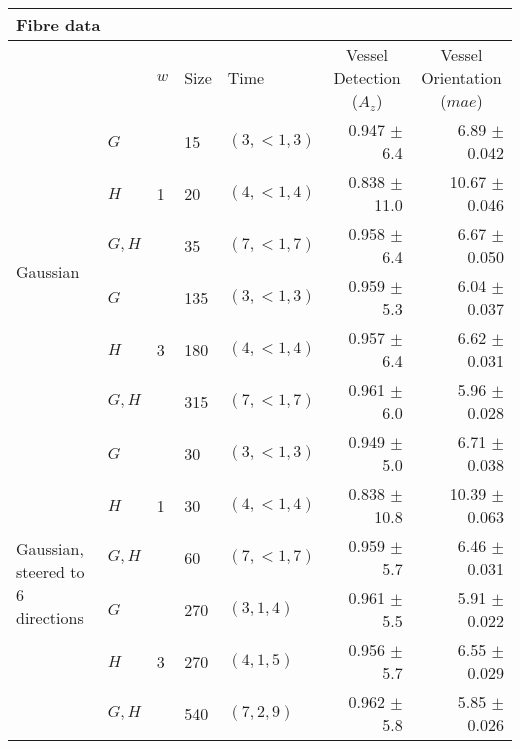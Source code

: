 \begin{tabularx}{\linewidth}{p{3cm} X X X X r r}
\toprule
\multicolumn{7}{l}{Fibre data} \\
\midrule
            &
            & $w$
            & Size
            & Time
            & \multicolumn{1}{c}{Vessel Detection \linebreak ($A_z$)}
            & \multicolumn{1}{c}{Vessel Orientation \linebreak ($mae$)}  \\         

\midrule
\multirow{6}{3cm}{ Gaussian }
            & $G$                   & \multirow{3}{1cm}{ 1 }   
                                    &      15 &$(3, {<}1, 3)$     & 0.947 $\pm$ 6.4 & 6.89 $\pm$ 0.042   \\
            & $H$                   &&     20 &$(4, {<}1, 4)$     & 0.838 $\pm$ 11.0& 10.67 $\pm$ 0.046  \\
            & $G, H$                &&     35 &$(7, {<}1, 7)$     & 0.958 $\pm$ 6.4 & 6.67 $\pm$ 0.050   \\
            & $G$                   & \multirow{3}{1cm}{ 3 }
                                    &     135 &$(3, {<}1, 3)$      & 0.959 $\pm$ 5.3 & 6.04 $\pm$ 0.037 \\
            & $H$                   &&    180 &$(4, {<}1, 4)$      & 0.957 $\pm$ 6.4 & 6.62 $\pm$ 0.031 \\
            & $G, H$                &&    315 &$(7, {<}1, 7)$      & 0.961 $\pm$ 6.0 & 5.96 $\pm$ 0.028 \\                        
           
\midrule
\multirow{6}{3cm}{Gaussian, \newline steered to 6 directions}
            & $G$                   & \multirow{3}{1cm}{ 1 }
                                    &      30 &$(3, {<}1, 3)$     & 0.949 $\pm$ 5.0   & 6.71 $\pm$ 0.038 \\
            & $H$                   &&     30 &$(4, {<}1, 4)$     & 0.838 $\pm$ 10.8   & 10.39 $\pm$ 0.063\\
            & $G,H$                 &&     60 &$(7, {<}1, 7)$     & 0.959 $\pm$ 5.7   & 6.46 $\pm$ 0.031 \\
            & $G$                   & \multirow{3}{1cm}{ 3 }
                                    &     270 &$(3, 1, 4)$      & 0.961 $\pm$ 5.5   & 5.91 $\pm$ 0.022 \\
            & $H$                   &&    270 &$(4, 1, 5)$      & 0.956 $\pm$ 5.7   & 6.55 $\pm$ 0.029 \\
            & $G,H$                 &&    540 &$(7, 2, 9)$      & 0.962 $\pm$ 5.8   & 5.85 $\pm$ 0.026 \\


\end{tabularx}
